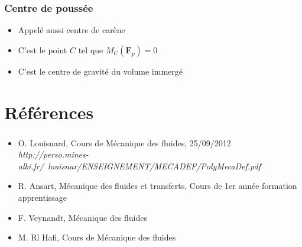 \documentclass[%
	final, %
	 10pt, %
 	compress, %
hyperref={bookmarks=true}	
]{beamer}
\renewcommand{\v}[1]{\ensuremath{\bm{#1}}} %
\begin{document}
\begin{frame}\frametitle{Centre de poussée}
\begin{itemize}
\item Appelé aussi centre de carène
\item C'est le point $C$ tel que $M_{C} (\v{F}_{p}) = 0$
\item C'est le centre de gravité du volume immergé
\end{itemize}
\end{frame}



\section{Références}
\label{sec:references}



\begin{frame}\frametitle{}
\begin{itemize}
\item O. Louisnard, Cours de Mécanique des fluides, 25/09/2012
  \textit{http://perso.mines-albi.fr/~louisnar/ENSEIGNEMENT/MECADEF/PolyMecaDef.pdf}
\item R. Ansart, Mécanique des fluides et transferts, Cours de 1er
  année formation apprentissage
\item F. Veynandt, Mécanique des fluides
\item M. Rl Hafi, Cours de Mécanique des fluides
\end{itemize}
\end{frame}









\end{document}
